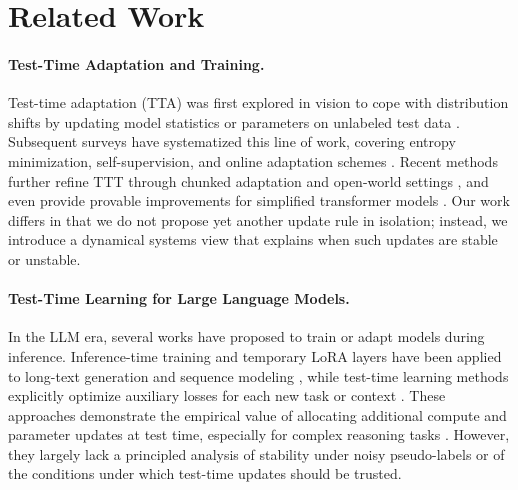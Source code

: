 \documentclass{article}
\theoremstyle{plain}
\theoremstyle{definition}
\theoremstyle{remark}
\begin{document}
\section{Related Work}

\paragraph{Test-Time Adaptation and Training.}
Test-time adaptation (TTA) was first explored in vision to cope with distribution shifts by updating model statistics or parameters on unlabeled test data \cite{sun2020ttt,wang2021tent,mummadi2021tta}. Subsequent surveys have systematized this line of work, covering entropy minimization, self-supervision, and online adaptation schemes \cite{zhang2024surveytta,wang2023otta,xiao2024beyond}. Recent methods further refine TTT through chunked adaptation and open-world settings \cite{sun2023learning,lact2025,owttt2025}, and even provide provable improvements for simplified transformer models \cite{provablettt2025}. Our work differs in that we do not propose yet another update rule in isolation; instead, we introduce a dynamical systems view that explains when such updates are stable or unstable.

\paragraph{Test-Time Learning for Large Language Models.}
In the LLM era, several works have proposed to train or adapt models during inference. Inference-time training and temporary LoRA layers have been applied to long-text generation and sequence modeling \cite{templora2024,templora2025emotion}, while test-time learning methods explicitly optimize auxiliary losses for each new task or context \cite{tlm2025,inplacettt2025,llmttt2024mm,xie2025memoryttt}. These approaches demonstrate the empirical value of allocating additional compute and parameter updates at test time, especially for complex reasoning tasks \cite{snell2024scaling,ttcsurvey2025,ttcompute2025,deepseek2025}. However, they largely lack a principled analysis of stability under noisy pseudo-labels or of the conditions under which test-time updates should be trusted.
\end{document}
